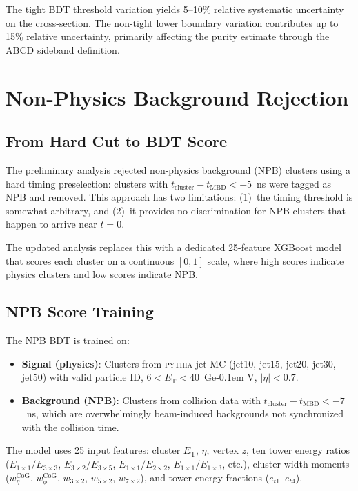 \documentclass[11pt,a4paper]{article}
\newcommand{\ET}{\ensuremath{E_{\text{T}}}\xspace}
\newcommand{\GeV}{\ifmmode {\mathrm{\ Ge\kern -0.1em V}}\else\textrm{Ge\kern -0.1em V}\fi\xspace}
\begin{document}
The tight BDT threshold variation yields 5--10\% relative systematic
uncertainty on the cross-section. The non-tight lower boundary variation
contributes up to 15\% relative uncertainty, primarily affecting the purity
estimate through the ABCD sideband definition.


\section{Non-Physics Background Rejection}
\label{sec:npb}

\subsection{From Hard Cut to BDT Score}
\label{subsec:npb_transition}

The preliminary analysis rejected non-physics background (NPB) clusters using a
hard timing preselection: clusters with $t_{\text{cluster}} - t_{\text{MBD}} < -5$~ns
were tagged as NPB and removed.
This approach has two limitations: (1)~the timing threshold is somewhat arbitrary,
and (2)~it provides no discrimination for NPB clusters that happen to arrive
near $t = 0$.

The updated analysis replaces this with a dedicated 25-feature XGBoost model
that scores each cluster on a continuous $[0, 1]$ scale, where high scores
indicate physics clusters and low scores indicate NPB.

\subsection{NPB Score Training}
\label{subsec:npb_training}

The NPB BDT is trained on:
\begin{itemize}
    \item \textbf{Signal (physics)}: Clusters from \textsc{pythia} jet MC
      (jet10, jet15, jet20, jet30, jet50) with valid particle ID,
      $6 < \ET < 40$~\GeV, $|\eta| < 0.7$.
    \item \textbf{Background (NPB)}: Clusters from collision data with
      $t_{\text{cluster}} - t_{\text{MBD}} < -7$~ns, which are
      overwhelmingly beam-induced backgrounds not synchronized with
      the collision time.
\end{itemize}

The model uses 25 input features: cluster \ET, $\eta$, vertex $z$, ten tower
energy ratios ($E_{1\times1}/E_{3\times3}$, $E_{3\times2}/E_{3\times5}$,
$E_{1\times1}/E_{2\times2}$, $E_{1\times1}/E_{1\times3}$, etc.), cluster width
moments ($w_\eta^{\text{CoG}}$, $w_\phi^{\text{CoG}}$, $w_{3\times2}$,
$w_{5\times2}$, $w_{7\times2}$), and tower energy fractions ($e_{t1}$--$e_{t4}$).
\end{document}

